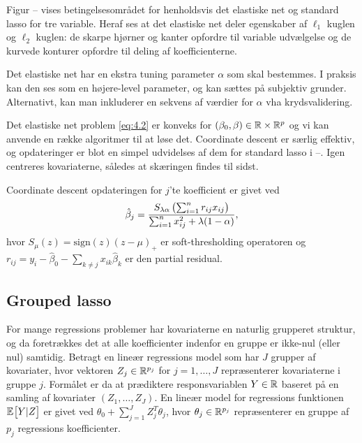 Figur -- vises betingelsesområdet for henholdsvis det elastiske net og standard lasso for tre variable.
Heraf ses at det elastiske net deler egenskaber af $\ell_1$ kuglen og $\ell_2$ kuglen: de skarpe hjørner og kanter opfordre til variable udvælgelse og de kurvede konturer opfordre til deling af koefficienterne.
%

Det elastiske net har en ekstra tuning parameter $\alpha$ som skal bestemmes.
I praksis kan den ses som en højere-level parameter, og kan sættes på subjektiv grunder. Alternativt, kan man inkluderer en sekvens af værdier for $\alpha$ vha krydsvalidering.

Det elastiske net problem \eqref{eq:4.2} er konveks for $(\beta_0, \beta) \in \mathbb{R} \times \mathbb{R}^p$ og vi kan anvende en række algoritmer til at løse det. 
Coordinate descent er særlig effektiv, og opdateringer er blot en simpel udvidelses af dem for standard lasso i --.
Igen centreres kovariaterne, således at skæringen findes til sidst.

Coordinate descent opdateringen for $j$'te koefficient er givet ved
\begin{align*}
\hat{\beta}_j = \frac{S_{\lambda \alpha} \del{\sum_{i=1}^n r_{ij} x_{ij}}}{\sum_{i=1}^n x_{ij}^2 + \lambda (1-\alpha)},
\end{align*} 
hvor $S_\mu(z)=\text{sign}(z)(z-\mu)_+$ er soft-thresholding operatoren og $r_{ij}=y_i - \hat{\beta}_0 - \sum_{k \neq j} x_{ik} \hat{\beta}_k$ er den partial residual.


\subsection{Grouped lasso}
For mange regressions problemer har kovariaterne en naturlig grupperet struktur, og da foretrækkes det at alle koefficienter indenfor en gruppe er ikke-nul (eller nul) samtidig.
Betragt en lineær regressions model som har $J$ grupper af kovariater, hvor vektoren $Z_j \in \mathbb{R}^{p_j}$ for $j=1, \ldots, J$ repræsenterer kovariaterne i gruppe $j$.
Formålet er da at prædiktere responsvariablen $Y \in \mathbb{R}$ baseret på en samling af kovariater $(Z_1,\ldots,Z_J)$.
En lineær model for regressions funktionen $\E{Y \vert Z}$ er givet ved \(\theta_0 + \sum_{j=1}^J Z_j^T \theta_j\), hvor $\theta_j \in \mathbb{R}^{p_j}$ repræsenterer en gruppe af $p_j$ regressions koefficienter. 

